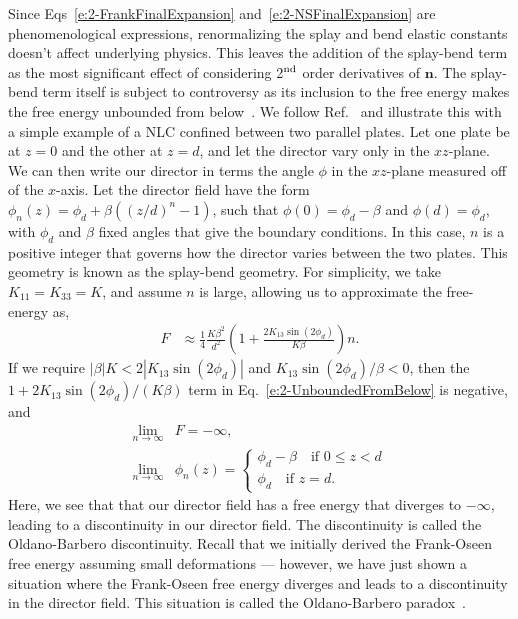 Since Eqs~\ref{e:2-FrankFinalExpansion} and~\ref{e:2-NSFinalExpansion} are phenomenological expressions, renormalizing the splay and bend elastic constants doesn't affect underlying physics.
This leaves the addition of the splay-bend term as the most significant effect of considering 2$^\textup{\rm nd}$ order derivatives of $\mathbf{n}$.
The splay-bend term itself is subject to controversy as its inclusion to the free energy makes the free energy unbounded from below~\cite{RN214,RN215,RN216}.
We follow Ref.~\cite{RN219} and illustrate this with a simple example of a NLC confined between two parallel plates.
Let one plate be at $z = 0$ and the other at $z=d$, and let the director vary only in the $xz$-plane.
We can then write our director in terms the angle $\phi$ in the $xz$-plane measured off of the $x$-axis.
Let the director field have the form $\phi_n(z) = \phi_d + \beta ((z/d)^n-1)$, such that $\phi(0) = \phi_d - \beta$ and $\phi(d) = \phi_d$, with $\phi_d$ and $\beta$ fixed angles that give the boundary conditions.
In this case, $n$ is a positive integer that governs how the director varies between the two plates.
This geometry is known as the splay-bend geometry.
For simplicity, we take $K_{11} = K_{33} = K$, and assume $n$ is large, allowing us to approximate the free-energy as,
\begin{align}
  F &\approx \frac{1}{4}\frac{K \beta^2}{d^2} \left ( 1 + \frac{2 K_{13} \sin(2 \phi_d)}{K \beta}  \right) n.\label{e:2-UnboundedFromBelow}
\end{align}
If we require $|\beta|K < 2| K_{13} \sin(2 \phi_d)| $ and $K_{13} \sin(2 \phi_d)/\beta < 0$, then the \\ $1 + 2 K_{13} \sin(2 \phi_d)/(K \beta) $ term in Eq.~\ref{e:2-UnboundedFromBelow} is negative, and
\begin{align}
  \lim_{n\to\infty} &F = -\infty, \\
  \lim_{n\to\infty} &\phi_n(z) =
  \begin{cases}
    \phi_d - \beta \quad \textrm{if }  0 \leq z  < d \\
    \phi_d \quad \textrm{if } z = d.
  \end{cases}
\end{align}
Here, we see that that our director field has a free energy that diverges to $- \infty$, leading to a discontinuity in our director field.
The discontinuity is called the Oldano-Barbero discontinuity.
Recall that we initially derived the Frank-Oseen free energy assuming small deformations --- however, we have just shown a situation where the Frank-Oseen free energy diverges and leads to a discontinuity in the director field.
This situation is called the Oldano-Barbero paradox~\cite{RN216,RN220,RN219,RN221}.

